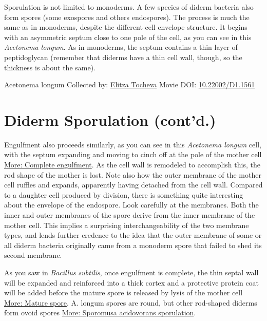 \documentclass[]{tufte-book}
\begin{document}
Sporulation is not limited to monoderms. A few species of diderm bacteria also form spores (some exospores and others endospores). The process is much the same as in monoderms, despite the different cell envelope structure. It begins with an asymmetric septum close to one pole of the cell, as you can see in this \emph{Acetonema longum}. As in monoderms, the septum contains a thin layer of peptidoglycan (remember that diderms have a thin cell wall, though, so the thickness is about the same).



\hypertarget{htmlwidget-26692d36b1f13bf92cce}{}

\label{fig:8-9}Acetonema longum Collected by: \protect\hyperlink{elitza_tocheva}{Elitza Tocheva} Movie DOI: \href{https://doi.org/10.22002/D1.1561}{10.22002/D1.1561}

\hypertarget{diderm-sporulation-contd.}{%
\section{Diderm Sporulation (cont'd.)}\label{diderm-sporulation-contd.}}

Engulfment also proceeds similarly, as you can see in this \emph{Acetonema longum} cell, with the septum expanding and moving to cinch off at the pole of the mother cell \protect\hyperlink{Complete_engulfment}{More: Complete engulfment}. As the cell wall is remodeled to accomplish this, the rod shape of the mother is lost. Note also how the outer membrane of the mother cell ruffles and expands, apparently having detached from the cell wall. Compared to a daughter cell produced by division, there is something quite interesting about the envelope of the endospore. Look carefully at the membranes. Both the inner and outer membranes of the spore derive from the inner membrane of the mother cell. This implies a surprising interchangeability of the two membrane types, and lends further credence to the idea that the outer membrane of some or all diderm bacteria originally came from a monoderm spore that failed to shed its second membrane.

As you saw in \emph{Bacillus subtilis}, once engulfment is complete, the thin septal wall will be expanded and reinforced into a thick cortex and a protective protein coat will be added before the mature spore is released by lysis of the mother cell \protect\hyperlink{Mature_spore}{More: Mature spore}. A. longum spores are round, but other rod-shaped diderms form ovoid spores \protect\hyperlink{Sporomusa_acidovorans_sporulation}{More: Sporomusa acidovorans sporulation}.
\end{document}
